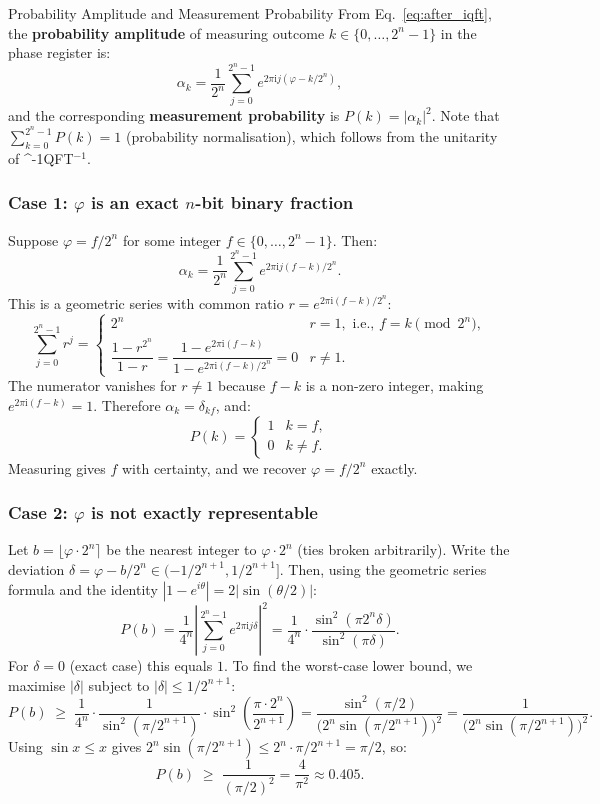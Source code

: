 \documentclass[12pt,a4paper]{article}
\newcommand{\IQFT}{\ifmmode \text{\textsc{QFT}}^{-1}\else \textsc{QFT}$^{-1}$\fi}
\newcommand{\ii}{\mathrm{i}}
\begin{document}
\begin{definition}{Probability Amplitude and Measurement Probability}{}
  From Eq.~\eqref{eq:after_iqft}, the \textbf{probability amplitude} of
  measuring outcome $k \in \{0, \ldots, 2^n-1\}$ in the phase register is:
  \[
    \alpha_k = \frac{1}{2^n}\sum_{j=0}^{2^n-1} e^{2\pi \ii j(\varphi - k/2^n)},
  \]
  and the corresponding \textbf{measurement probability} is $P(k) = |\alpha_k|^2$.
  Note that $\sum_{k=0}^{2^n-1} P(k) = 1$ (probability normalisation), which
  follows from the unitarity of \IQFT.
\end{definition}

\medskip

\subsubsection{Case 1: $\varphi$ is an exact $n$-bit binary fraction}

Suppose $\varphi = f/2^n$ for some integer $f \in \{0,\ldots,2^n-1\}$.  Then:
\[
  \alpha_k = \frac{1}{2^n}\sum_{j=0}^{2^n-1} e^{2\pi \ii j(f-k)/2^n}.
\]
This is a geometric series with common ratio $r = e^{2\pi\ii(f-k)/2^n}$:
\[
  \sum_{j=0}^{2^n-1} r^j =
  \begin{cases}
    2^n & r = 1, \text{ i.e., } f = k \pmod{2^n}, \\
    \dfrac{1 - r^{2^n}}{1 - r} = \dfrac{1 - e^{2\pi\ii(f-k)}}{1 - e^{2\pi\ii(f-k)/2^n}} = 0
      & r \neq 1.
  \end{cases}
\]
The numerator vanishes for $r\neq 1$ because $f-k$ is a non-zero integer,
making $e^{2\pi\ii(f-k)} = 1$.  Therefore $\alpha_k = \delta_{kf}$, and:
\[
  \boxed{P(k) =
  \begin{cases}
    1 & k = f, \\
    0 & k \neq f.
  \end{cases}}
\]
Measuring gives $f$ with certainty, and we recover $\varphi = f/2^n$ exactly.

\subsubsection{Case 2: $\varphi$ is not exactly representable}

Let $b = \lfloor \varphi \cdot 2^n \rceil$ be the nearest integer to $\varphi\cdot 2^n$
(ties broken arbitrarily).  Write the deviation
$\delta = \varphi - b/2^n \in (-1/2^{n+1}, 1/2^{n+1}]$.  Then, using the
geometric series formula and the identity $|1 - e^{i\theta}| = 2|\sin(\theta/2)|$:
\[
  P(b)
  = \frac{1}{4^n}\left|\sum_{j=0}^{2^n-1}e^{2\pi \ii j\delta}\right|^2
  = \frac{1}{4^n}\cdot\frac{\sin^2(\pi 2^n \delta)}{\sin^2(\pi\delta)}.
\]
For $\delta = 0$ (exact case) this equals $1$.  To find the worst-case
lower bound, we maximise $|\delta|$ subject to $|\delta| \leq 1/2^{n+1}$:
\[
  P(b) \;\geq\; \frac{1}{4^n}\cdot\frac{1}{\sin^2(\pi/2^{n+1})}\cdot\sin^2\!\left(\frac{\pi\cdot 2^n}{2^{n+1}}\right)
  = \frac{\sin^2(\pi/2)}{\bigl(2^n \sin(\pi/2^{n+1})\bigr)^2}
  = \frac{1}{\bigl(2^n \sin(\pi/2^{n+1})\bigr)^2}.
\]
Using $\sin x \leq x$ gives $2^n\sin(\pi/2^{n+1}) \leq 2^n \cdot \pi/2^{n+1} = \pi/2$, so:
\[
  P(b) \;\geq\; \frac{1}{(\pi/2)^2} = \frac{4}{\pi^2} \approx 0.405.
\]
\end{document}
